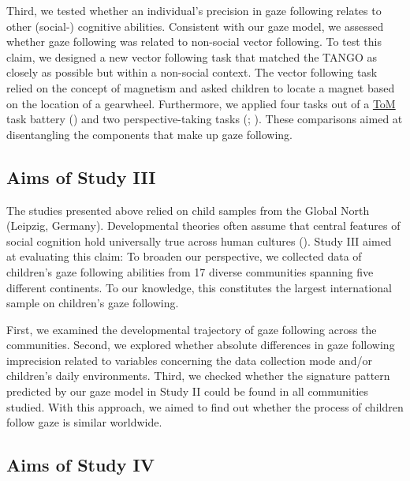 \documentclass[
]{scrbook}
\begin{document}
Third, we tested whether an individual's precision in gaze following relates to other (social-) cognitive abilities. Consistent with our gaze model, we assessed whether gaze following was related to non-social vector following. To test this claim, we designed a new vector following task that matched the TANGO as closely as possible but within a non-social context. The vector following task relied on the concept of magnetism and asked children to locate a magnet based on the location of a gearwheel. Furthermore, we applied four tasks out of a \hyperref[acronyms_ToM]{ToM} task battery () and two perspective-taking tasks (; ). These comparisons aimed at disentangling the components that make up gaze following.

\subsection{Aims of Study III}\label{aims-of-study-iii}

The studies presented above relied on child samples from the Global North (Leipzig, Germany). Developmental theories often assume that central features of social cognition hold universally true across human cultures (). Study III aimed at evaluating this claim: To broaden our perspective, we collected data of children's gaze following abilities from 17 diverse communities spanning five different continents. To our knowledge, this constitutes the largest international sample on children's gaze following.

First, we examined the developmental trajectory of gaze following across the communities. Second, we explored whether absolute differences in gaze following imprecision related to variables concerning the data collection mode and/or children's daily environments. Third, we checked whether the signature pattern predicted by our gaze model in Study II could be found in all communities studied. With this approach, we aimed to find out whether the process of children follow gaze is similar worldwide.

\subsection{Aims of Study IV}\label{aims-of-study-iv}
\end{document}
